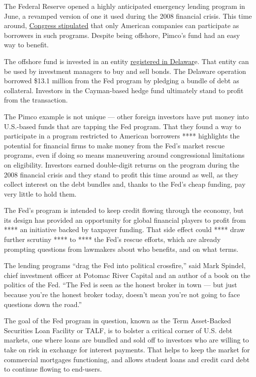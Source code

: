 The Federal Reserve opened a highly anticipated emergency lending
program in June, a revamped version of one it used during the 2008
financial crisis. This time around,
\href{https://assets.documentcloud.org/documents/20059055/final-final-cares-act.pdf}{Congress
stipulated} that only American companies can participate as borrowers in
such programs. Despite being offshore, Pimco's fund had an easy way to
benefit.

The offshore fund is invested in an entity
\href{https://icis.corp.delaware.gov/ecorp/entitysearch/NameSearch.aspx}{registered
in Delawar}e. That entity can be used by investment managers to buy and
sell bonds. The Delaware operation borrowed \$13.1 million from the Fed
program by pledging a bundle of debt as collateral. Investors in the
Cayman-based hedge fund ultimately stand to profit from the transaction.

The Pimco example is not unique --- other foreign investors have put
money into U.S.-based funds that are tapping the Fed program. That they
found a way to participate in a program restricted to American borrowers
**** highlights the potential for financial firms to make money from the
Fed's market rescue programs, even if doing so means maneuvering around
congressional limitations on eligibility. Investors earned double-digit
returns on the program during the 2008 financial crisis and they stand
to profit this time around as well, as they collect interest on the debt
bundles and, thanks to the Fed's cheap funding, pay very little to hold
them.

The Fed's program is intended to keep credit flowing through the
economy, but its design has provided an opportunity for global financial
players to profit from **** an initiative backed by taxpayer funding.
That side effect could **** draw further scrutiny **** to **** the Fed's
rescue efforts, which are already prompting questions from lawmakers
about who benefits, and on what terms.

The lending programs ``drag the Fed into political crossfire,'' said
Mark Spindel, chief investment officer at Potomac River Capital and an
author of a book on the politics of the Fed. ``The Fed is seen as the
honest broker in town --- but just because you're the honest broker
today, doesn't mean you're not going to face questions down the road.''

The goal of the Fed program in question, known as the Term Asset-Backed
Securities Loan Facility or TALF, is to bolster a critical corner of
U.S. debt markets, one where loans are bundled and sold off to investors
who are willing to take on risk in exchange for interest payments. That
helps to keep the market for commercial mortgages functioning, and
allows student loans and credit card debt to continue flowing to
end-users.


